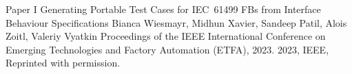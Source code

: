 \documentclass[12pt,a4paper,openright,final,twoside]{cseethesis}
\begin{document}
\def\paperheader{Paper I}
\def\papertitle{Generating Portable Test Cases for IEC~61499 FBs from Interface Behaviour Specifications}
\def\paperauthorstring{Bianca Wiesmayr, Midhun Xavier, Sandeep Patil, Alois Zoitl, Valeriy Vyatkin}
\def\referencestring{Proceedings of the IEEE International Conference on Emerging Technologies and Factory Automation (ETFA), 2023.}
\def\copyrightstring{2023, IEEE, Reprinted with permission.}


\makepaperaccepted
  {\paperheader}
  {\papertitle}
  {\paperauthorstring}
  {\referencestring}
  {\copyrightstring}






\printglossary[type=\acronymtype]
\end{document}
